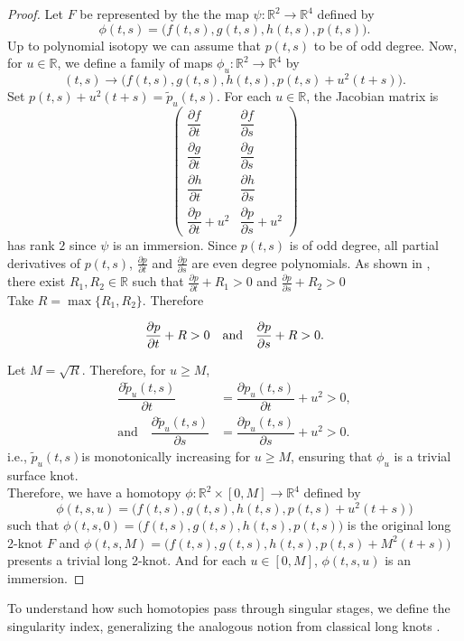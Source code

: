 \documentclass[10pt,a4paper,reqno]{amsart}
\theoremstyle{definition}
\theoremstyle{remark}
\newcommand{\R}{\mathbb R}
\begin{document}
 \begin{proof}
 	Let $F$ be represented by the the map $\psi: \R^{2} \rightarrow \R^{4}$ defined by 
 	\[ \phi(t,s) =\big( f(t,s), g(t,s), h(t,s), p(t,s) \big).\]
 	Up to polynomial isotopy we can assume that $p(t,s)$ to be of odd degree. Now,
 	for $u \in \R$, we define a family of maps $\phi_{u}: \R^{2} \rightarrow \R^{4}$ by
 	\[ (t,s) \rightarrow \big( f(t,s), g(t,s), h(t,s), p(t,s)+u^{2}(t+s) \big).\] 
 	Set $p(t,s)+u^{2}(t+s) = \tilde{p}_{u}(t,s)$.
 	For each $u \in \R$, the  Jacobian matrix is
 	\[\begin{pmatrix}
 		\dfrac{\partial f}{\partial t} & \dfrac{\partial f}{\partial s} \\[0.3cm]
 		\dfrac{\partial g}{\partial t}  & \dfrac{\partial g}{\partial s} \\[0.3cm]
 		\dfrac{\partial h}{\partial t} & \dfrac{\partial h}{\partial s} \\[0.3cm]
 		\dfrac{\partial p}{\partial t}+u^{2} & \dfrac{\partial p}{\partial s}+ u^{2}
 	\end{pmatrix}\]
 	has rank $2$ since $\psi$ is an immersion.
 	Since $p(t,s)$ is of odd degree, all partial derivatives of $p(t,s)$, $\frac{\partial p}{\partial t}$ and $\frac{\partial p}{\partial s}$ are even degree polynomials. As shown in  \cite{Mis14}, there exist $R_{1},R_{2} \in \R$ such that
 	$\frac{\partial p}{\partial t} +R_{1} >0$ and $\frac{\partial p}{\partial s} +R_{2} >0$\\
 	Take $R =\max \{R_{1},R_{2}\}$. Therefore
 	
 	\[	\frac{\partial p}{\partial t} +R  >0\quad \hfill
 		\text{and} \quad \frac{\partial p}{\partial s} +R  >0 .\]
 	
 	Let $M= \sqrt{R}$. Therefore,	for $u \geq M$,
 	\begin{align*}
 		\dfrac{\partial \tilde{p}_{u}(t,s)}{\partial t}&= \dfrac{\partial p_{u}(t,s)}{\partial t}+ u^{2}  > 0,\\
 		\text{and} \quad \dfrac{\partial \tilde{p}_{u}(t,s)}{\partial s}&= \dfrac{\partial p_{u}(t,s)}{\partial s}+ u^{2}  > 0 .
 	\end{align*}   
 	i.e., $\tilde{p}_{u}(t,s)$is monotonically increasing for $u \geq M$, ensuring that $\phi_u$ is a trivial surface knot.\\
 	Therefore, we have a homotopy $\phi: \R^{2} \times [0,M] \rightarrow \R^{4}$ defined by 
 	\[\phi(t,s,u)=\big( f(t,s), g(t,s), h(t,s), p(t,s)+u^{2}(t+s) \big)\]
 	such that $\phi(t,s,0)=\big( f(t,s), g(t,s), h(t,s), p(t,s)\big)$ is the original long 2-knot $F$ and $\phi(t,s,M)=\big( f(t,s), g(t,s), h(t,s), p(t,s)+ M^{2}(t+s)\big)$ presents a trivial long 2-knot. And for each $u \in [0,M]$, $\phi(t,s,u)$ is an immersion. 
  \end{proof}
 To understand how such homotopies pass through singular stages, we define the singularity index, generalizing the analogous notion from classical long knots \cite{Mis14}.
 
\end{document}
